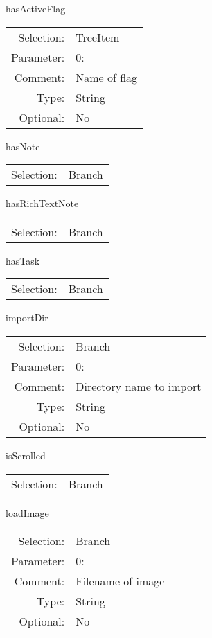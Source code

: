 \item hasActiveFlag\\
\begin{tabular}{rl}
  Selection: & TreeItem\\
   Parameter: &  0:\\
        Comment: & Name of flag\\
           Type: & String\\
       Optional: &  No\\
\end{tabular}

\item hasNote\\
\begin{tabular}{rl}
  Selection: & Branch\\
\end{tabular}

\item hasRichTextNote\\
\begin{tabular}{rl}
  Selection: & Branch\\
\end{tabular}

\item hasTask\\
\begin{tabular}{rl}
  Selection: & Branch\\
\end{tabular}

\item importDir\\
\begin{tabular}{rl}
  Selection: & Branch\\
   Parameter: &  0:\\
        Comment: & Directory name to import\\
           Type: & String\\
       Optional: &  No\\
\end{tabular}

\item isScrolled\\
\begin{tabular}{rl}
  Selection: & Branch\\
\end{tabular}

\item loadImage\\
\begin{tabular}{rl}
  Selection: & Branch\\
   Parameter: &  0:\\
        Comment: & Filename of image\\
           Type: & String\\
       Optional: &  No\\
\end{tabular}


